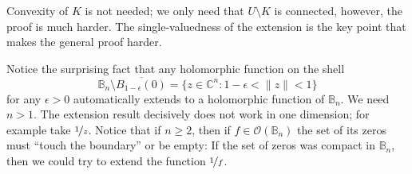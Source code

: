 \documentclass[12pt,openany]{book}
\newcommand{\snorm}[1]{\lVert {#1} \rVert}
\newcommand{\C}{{\mathbb{C}}}
\newcommand{\bB}{{\mathbb{B}}}
\newcommand{\sO}{{\mathscr{O}}}
\theoremstyle{plain}
\theoremstyle{remark}
\theoremstyle{definition}
\theoremstyle{exercise}
\theoremstyle{example}
\begin{document}
Convexity of $K$ is not needed; we only need that $U\setminus K$
is connected, however, the proof is much harder.
The single-valuedness of the extension is the key point that makes the
general proof harder.

Notice the surprising fact that any holomorphic function on
the shell
\begin{equation*}
\bB_n \setminus \overline{B_{1-\epsilon}(0)} =
\bigl\{ z \in \C^n : 1-\epsilon < \snorm{z} < 1 \bigr\}
\end{equation*}
for any $\epsilon > 0$ automatically
extends to a holomorphic function of $\bB_n$.  We need $n > 1$.
The extension result decisively does not work in one dimension; for
example take $\nicefrac{1}{z}$.
Notice that if $n \geq 2$, then if $f \in \sO(\bB_n)$
the set of its zeros must 
``touch the boundary'' or be empty:  If the set of zeros was 
compact in $\bB_n$, then we could try to
extend the function $\nicefrac{1}{f}$.
\end{document}
